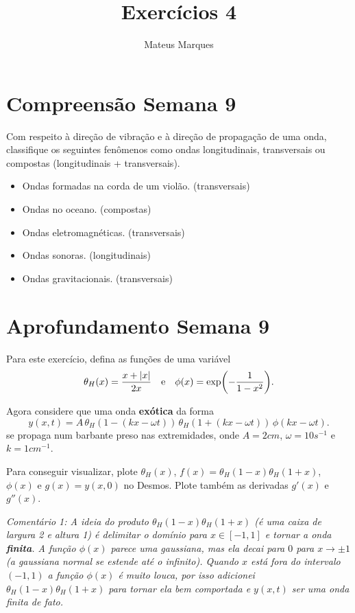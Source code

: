 \documentclass[a4paper,10pt]{article}
\title{\Huge{\textbf{Exercícios 4}}}
\author{Mateus Marques}
\begin{document}
\maketitle

\section{Compreensão Semana 9}

Com respeito à direção de vibração e à direção de propagação de uma onda, classifique os seguintes fenômenos como ondas longitudinais, transversais ou compostas (longitudinais + transversais).

\begin{itemize}
\item Ondas formadas na corda de um violão. (transversais)
\item Ondas no oceano. (compostas)
\item Ondas eletromagnéticas. (transversais)
\item Ondas sonoras. (longitudinais)
\item Ondas gravitacionais. (transversais)
\end{itemize}


\section{Aprofundamento Semana 9}

Para este exercício, defina as funções de uma variável
$$
\theta_H(x) = \frac{x +  \abs{x}}{2x} \quad \mathrm{e} \quad \phi(x) = \exp(-\frac{1}{1-x^2}).
$$

Agora considere que uma onda \textbf{exótica} da forma
$$
y(x,t) = A \, \theta_H(1 - (kx - \omega t)) \, \theta_H(1 + (kx - \omega t)) \, \phi(kx - \omega t).
$$ se propaga num barbante preso nas extremidades, onde $A = 2 \unit{cm}$, $\omega = 10 \unit{s^{-1}}$ e $k = 1 \unit{cm^{-1}}$.

\n

Para conseguir visualizar, plote $\theta_H(x)$, $f(x) = \theta_H(1-x) \theta_H(1+x)$, $\phi(x)$ e $g(x) = y(x, 0)$ no Desmos. Plote também as derivadas $g'(x)$ e $g''(x)$.

\n\n

\textit{Comentário 1: A ideia do produto $\theta_H(1-x) \theta_H(1+x)$ (é uma caixa de largura 2 e altura 1) é delimitar o domínio para $x \in [-1, 1]$ e tornar a onda \textbf{finita}. A função $\phi(x)$ parece uma gaussiana, mas ela decai para $0$ para $x \to \pm 1$ (a gaussiana normal se estende até o infinito). Quando $x$ está fora do intervalo $(-1, 1)$ a função $\phi(x)$ é muito louca, por isso adicionei $\theta_H(1-x) \theta_H(1+x)$ para tornar ela bem comportada e $y(x,t)$ ser uma onda finita de fato.}
\end{document}
